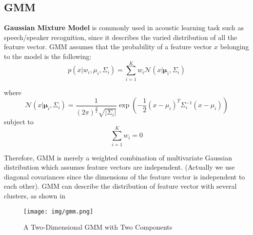 
\subsection{GMM}
\textbf{Gaussian Mixture Model} is commonly used in acoustic learning task such as speech/speaker recognition,
since it describes the varied distribution of all the feature vector.\cite{GMM}
GMM assumes that the probability of a feature vector $x$ belonging to the model is the following:
\begin{equation}
p(x | w_i, \mu_i, \Sigma_i) = \sum_{i=1}^{K}{w_i \mathcal{N}(x | \mathbf{\mu}_i, \Sigma_i)}
\label{eqn:gmm}
\end{equation}

where
\[\mathcal{N}(x | \mathbf{\mu}_i, \Sigma_i) = \dfrac{1}{(2\pi)^{\frac{d}{2}}\sqrt{|\Sigma_i|}}
\exp \left({-\dfrac{1}{2}(x-\mu_i)^T\Sigma_i^{-1}(x-\mu_i)}\right)\]
subject to
\[\sum_{i=1}^{K} w_i = 0\]

  Therefore, GMM is merely a weighted combination of multivariate Gaussian distribution which
  assumes feature vectors are independent.
  (Actually we use diagonal covariances since the dimensions of the feature vector is independent to each other).
  GMM can describe the distribution of feature vector with several clusters, as shown in 
\begin{figure}[H]
  \centering
  \texttt{[image: img/gmm.png]}
  \caption{A Two-Dimensional GMM with Two Components\label{fig:gmm-fig}}
\end{figure}

